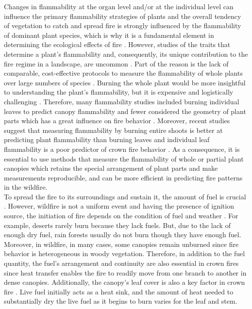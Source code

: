 \documentclass[12pt]{report}
\begin{document}
 Changes in flammability at the organ level and/or at the individual level can influence the primary flammability strategies of plants \citep{pausas2017flammability} and the overall tendency of vegetation to catch and spread fire is strongly influenced by the flammability of dominant plant species, which is why it is a fundamental element in determining the ecological effects of fire \citep{bond1995kill, lavorel2002predicting, bond2005fire}. However, studies of the traits that determine a plant's flammability and, consequently, its unique contribution to the fire regime in a landscape, are uncommon \citep{schwilk2015dimensions, pausas2017flammability}. Part of the reason is the lack of comparable, cost-effective protocols to measure the flammability of whole plants over large numbers of species \citep{jaureguiberry2011device}. Burning the whole plant would be more insightful to understanding the plant's flammability, but it is expensive and logistically challenging \citep{jaureguiberry2011device, pausasandmoi2012flammability}. Therefore, many flammability studies included burning individual leaves to predict canopy flammability and fewer considered the geometry of plant parts which has a great influence on fire behavior \citep{schwilk2003flammability, gao2018grass, calitz2015investigating,pausas2012fires}. Moreover, recent studies suggest that measuring flammability by burning entire shoots is better at predicting plant flammability than burning leaves \citep{alam2020shoot} and individual leaf flammability is a poor predictor of crown fire behavior \citep{fernandes2012plant}. As a consequence, it is essential to use methods that measure the flammability of whole or partial plant canopies which retains the special arrangement of plant parts and make measurements reproducible, and can be more efficient in predicting fire patterns in the wildfire.\\

To spread the fire to its surroundings and sustain it, the amount of fuel is crucial \citep{rothermel1972mathematical}. However, wildfire is not a uniform event and having the presence of ignition source, the initiation of fire depends on the condition of fuel and weather \citep{bond1996fire}. For example, deserts rarely burn because they lack fuels. But, due to the lack of enough dry fuel, rain forests usually do not burn though they have enough fuel. Moreover, in wildfire, in many cases, some canopies remain unburned since fire behavior is heterogeneous in woody vegetation. Therefore, in addition to the fuel quantity, the fuel's arrangement and continuity are also essential in crown fires \citep{bond1996fire} since heat transfer enables the fire to readily move from one branch to another in dense canopies. Additionally, the canopy's leaf cover is  also a key factor in crown fire \citep{ray2005micrometeorological}. Live fuel initially acts as a heat sink, and the amount of heat needed to substantially dry the live fuel as it begins to burn varies for the leaf and stem.\\
\end{document}
